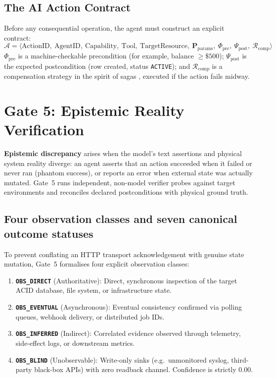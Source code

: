 \documentclass[11pt,a4paper]{article}
\begin{document}
\subsection{The AI Action Contract}
Before any consequential operation, the agent must construct an explicit contract:
\begin{equation}
\mathcal A=\big\langle \text{ActionID},\ \text{AgentID},\ \text{Capability},\ \text{Tool},\ \text{TargetResource},\ \mathbf P_{\text{params}},\ \Phi_{\text{pre}},\ \Psi_{\text{post}},\ \mathcal R_{\text{comp}}\big\rangle
\end{equation}
$\Phi_{\text{pre}}$ is a machine-checkable precondition (for example, balance $\ge\$500$); $\Psi_{\text{post}}$ is the expected postcondition (row created, status \texttt{ACTIVE}); and $\mathcal R_{\text{comp}}$ is a compensation strategy in the spirit of sagas \cite{garcia1987}, executed if the action fails midway.

\section{Gate 5: Epistemic Reality Verification}\label{sec:gate5}
\textbf{Epistemic discrepancy} arises when the model's text assertions and physical system reality diverge: an agent asserts that an action succeeded when it failed or never ran (phantom success), or reports an error when external state was actually mutated. Gate~5 runs independent, non-model verifier probes against target environments and reconciles declared postconditions with physical ground truth.

\subsection{Four observation classes and seven canonical outcome statuses}
To prevent conflating an HTTP transport acknowledgement with genuine state mutation, Gate~5 formalises four explicit observation classes:
\begin{enumerate}[leftmargin=*,itemsep=1pt]
  \item \textbf{\texttt{OBS\_DIRECT}} (Authoritative): Direct, synchronous inspection of the target ACID database, file system, or infrastructure state.
  \item \textbf{\texttt{OBS\_EVENTUAL}} (Asynchronous): Eventual consistency confirmed via polling queues, webhook delivery, or distributed job IDs.
  \item \textbf{\texttt{OBS\_INFERRED}} (Indirect): Correlated evidence observed through telemetry, side-effect logs, or downstream metrics.
  \item \textbf{\texttt{OBS\_BLIND}} (Unobservable): Write-only sinks (e.g.\ unmonitored syslog, third-party black-box APIs) with zero readback channel. Confidence is strictly $0.00$.
\end{enumerate}
\end{document}
